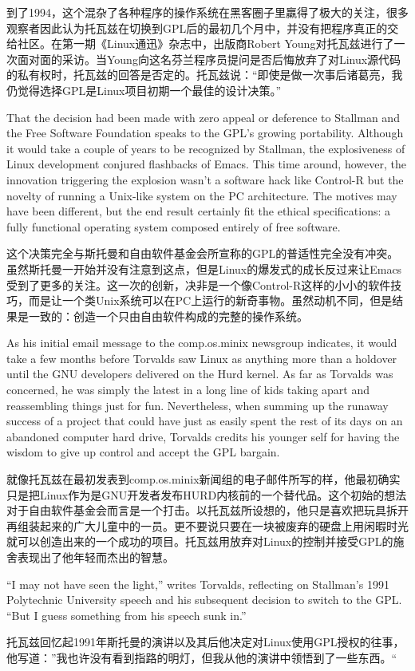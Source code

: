 \ifdefined\chs
到了1994，这个混杂了各种程序的操作系统在黑客圈子里羸得了极大的关注，很多观察者因此认为托瓦兹在切换到GPL后的最初几个月中，并没有把程序真正的交给社区。在第一期《Linux通迅》杂志中，出版商Robert Young对托瓦兹进行了一次面对面的采访。当Young向这名芬兰程序员提问是否后悔放弃了对Linux源代码的私有权时，托瓦兹的回答是否定的。托瓦兹说：“即使是做一次事后诸葛亮，我仍觉得选择GPL是Linux项目初期一个最佳的设计决策。”
\fi

\ifdefined\eng
That the decision had been made with zero appeal or deference to Stallman and the Free Software Foundation speaks to the GPL's growing portability. Although it would take a couple of years to be recognized by Stallman, the explosiveness of Linux development conjured flashbacks of Emacs. This time around, however, the innovation triggering the explosion wasn't a software hack like Control-R but the novelty of running a Unix-like system on the PC architecture. The motives may have been different, but the end result certainly fit the ethical specifications: a fully functional operating system composed entirely of free software.
\fi

\ifdefined\chs
这个决策完全与斯托曼和自由软件基金会所宣称的GPL的普适性完全没有冲突。虽然斯托曼一开始并没有注意到这点，但是Linux的爆发式的成长反过来让Emacs受到了更多的关注。这一次的创新，决非是一个像Control-R这样的小小的软件技巧，而是让一个类Unix系统可以在PC上运行的新奇事物。虽然动机不同，但是结果是一致的：创造一个只由自由软件构成的完整的操作系统。
\fi

\ifdefined\eng
As his initial email message to the comp.os.minix newsgroup indicates, it would take a few months before Torvalds saw Linux as anything more than a holdover until the GNU developers delivered on the Hurd kernel. As far as Torvalds was concerned, he was simply the latest in a long line of kids taking apart and reassembling things just for fun. Nevertheless, when summing up the runaway success of a project that could have just as easily spent the rest of its days on an abandoned computer hard drive, Torvalds credits his younger self for having the wisdom to give up control and accept the GPL bargain.
\fi

\ifdefined\chs
就像托瓦兹在最初发表到comp.os.minix新闻组的电子邮件所写的样，他最初确实只是把Linux作为是GNU开发者发布HURD内核前的一个替代品。这个初始的想法对于自由软件基金会而言是一个打击。以托瓦兹所设想的，他只是喜欢把玩具拆开再组装起来的广大儿童中的一员。更不要说只要在一块被废弃的硬盘上用闲暇时光就可以创造出来的一个成功的项目。托瓦兹用放弃对Linux的控制并接受GPL的施舍表现出了他年轻而杰出的智慧。
\fi

\ifdefined\eng
``I may not have seen the light,'' writes Torvalds, reflecting on Stallman's 1991 Polytechnic University speech and his subsequent decision to switch to the GPL. ``But I guess something from his speech sunk in.''
\fi

\ifdefined\chs
托瓦兹回忆起1991年斯托曼的演讲以及其后他决定对Linux使用GPL授权的往事，他写道：”我也许没有看到指路的明灯，但我从他的演讲中领悟到了一些东西。“ 
\fi

\theendnotes
\setcounter{endnote}{0}
